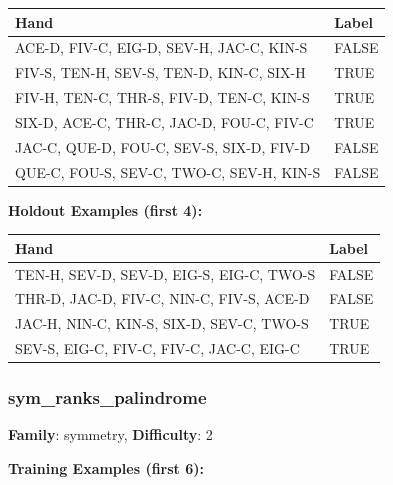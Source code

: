 \documentclass[10pt,a4paper]{article}
\begin{document}
\begin{small}
\begin{tabular}{p{8cm}l}
\toprule
Hand & Label \\
\midrule
ACE-D, FIV-C, EIG-D, SEV-H, JAC-C, KIN-S & \textcolor{negative}{FALSE} \\
FIV-S, TEN-H, SEV-S, TEN-D, KIN-C, SIX-H & \textcolor{positive}{TRUE} \\
FIV-H, TEN-C, THR-S, FIV-D, TEN-C, KIN-S & \textcolor{positive}{TRUE} \\
SIX-D, ACE-C, THR-C, JAC-D, FOU-C, FIV-C & \textcolor{positive}{TRUE} \\
JAC-C, QUE-D, FOU-C, SEV-S, SIX-D, FIV-D & \textcolor{negative}{FALSE} \\
QUE-C, FOU-S, SEV-C, TWO-C, SEV-H, KIN-S & \textcolor{negative}{FALSE} \\
\bottomrule
\end{tabular}
\end{small}

\textbf{Holdout Examples (first 4):}

\begin{small}
\begin{tabular}{p{8cm}l}
\toprule
Hand & Label \\
\midrule
TEN-H, SEV-D, SEV-D, EIG-S, EIG-C, TWO-S & \textcolor{negative}{FALSE} \\
THR-D, JAC-D, FIV-C, NIN-C, FIV-S, ACE-D & \textcolor{negative}{FALSE} \\
JAC-H, NIN-C, KIN-S, SIX-D, SEV-C, TWO-S & \textcolor{positive}{TRUE} \\
SEV-S, EIG-C, FIV-C, FIV-C, JAC-C, EIG-C & \textcolor{positive}{TRUE} \\
\bottomrule
\end{tabular}
\end{small}

\vspace{0.5cm}

\subsubsection{sym\_ranks\_palindrome}

\textbf{Family}: symmetry, \textbf{Difficulty}: 2

\textbf{Training Examples (first 6):}
\end{document}
